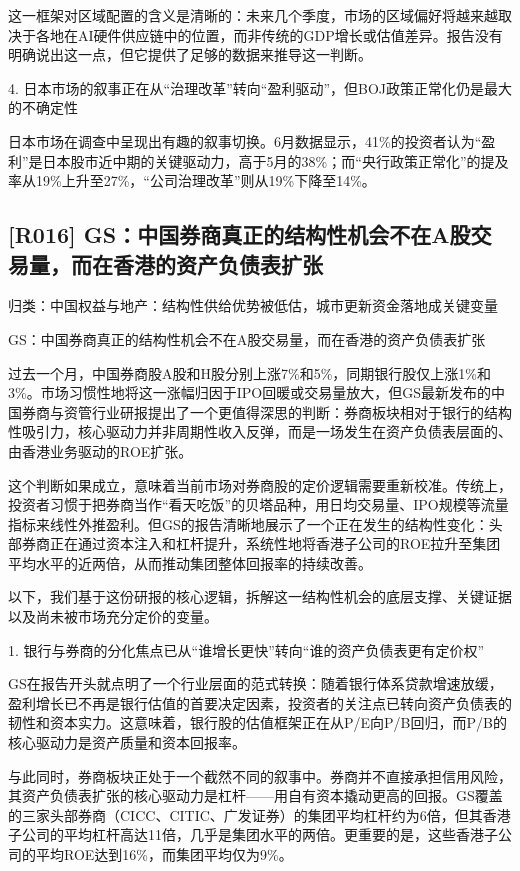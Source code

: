 \documentclass[11pt]{ctexart}
\begin{document}
这一框架对区域配置的含义是清晰的：未来几个季度，市场的区域偏好将越来越取决于各地在AI硬件供应链中的位置，而非传统的GDP增长或估值差异。报告没有明确说出这一点，但它提供了足够的数据来推导这一判断。

4. 日本市场的叙事正在从“治理改革”转向“盈利驱动”，但BOJ政策正常化仍是最大的不确定性

日本市场在调查中呈现出有趣的叙事切换。6月数据显示，41\%的投资者认为“盈利”是日本股市近中期的关键驱动力，高于5月的38\%；而“央行政策正常化”的提及率从19\%上升至27\%，“公司治理改革”则从19\%下降至14\%。

\subsection{[R016] GS：中国券商真正的结构性机会不在A股交易量，而在香港的资产负债表扩张}
{\small\color{refgray}归类：中国权益与地产：结构性供给优势被低估，城市更新资金落地成关键变量}

GS：中国券商真正的结构性机会不在A股交易量，而在香港的资产负债表扩张

过去一个月，中国券商股A股和H股分别上涨7\%和5\%，同期银行股仅上涨1\%和3\%。市场习惯性地将这一涨幅归因于IPO回暖或交易量放大，但GS最新发布的中国券商与资管行业研报提出了一个更值得深思的判断：券商板块相对于银行的结构性吸引力，核心驱动力并非周期性收入反弹，而是一场发生在资产负债表层面的、由香港业务驱动的ROE扩张。

这个判断如果成立，意味着当前市场对券商股的定价逻辑需要重新校准。传统上，投资者习惯于把券商当作“看天吃饭”的贝塔品种，用日均交易量、IPO规模等流量指标来线性外推盈利。但GS的报告清晰地展示了一个正在发生的结构性变化：头部券商正在通过资本注入和杠杆提升，系统性地将香港子公司的ROE拉升至集团平均水平的近两倍，从而推动集团整体回报率的持续改善。

以下，我们基于这份研报的核心逻辑，拆解这一结构性机会的底层支撑、关键证据以及尚未被市场充分定价的变量。

1. 银行与券商的分化焦点已从“谁增长更快”转向“谁的资产负债表更有定价权”

GS在报告开头就点明了一个行业层面的范式转换：随着银行体系贷款增速放缓，盈利增长已不再是银行估值的首要决定因素，投资者的关注点已转向资产负债表的韧性和资本实力。这意味着，银行股的估值框架正在从P/E向P/B回归，而P/B的核心驱动力是资产质量和资本回报率。

与此同时，券商板块正处于一个截然不同的叙事中。券商并不直接承担信用风险，其资产负债表扩张的核心驱动力是杠杆——用自有资本撬动更高的回报。GS覆盖的三家头部券商（CICC、CITIC、广发证券）的集团平均杠杆约为6倍，但其香港子公司的平均杠杆高达11倍，几乎是集团水平的两倍。更重要的是，这些香港子公司的平均ROE达到16\%，而集团平均仅为9\%。
\end{document}
